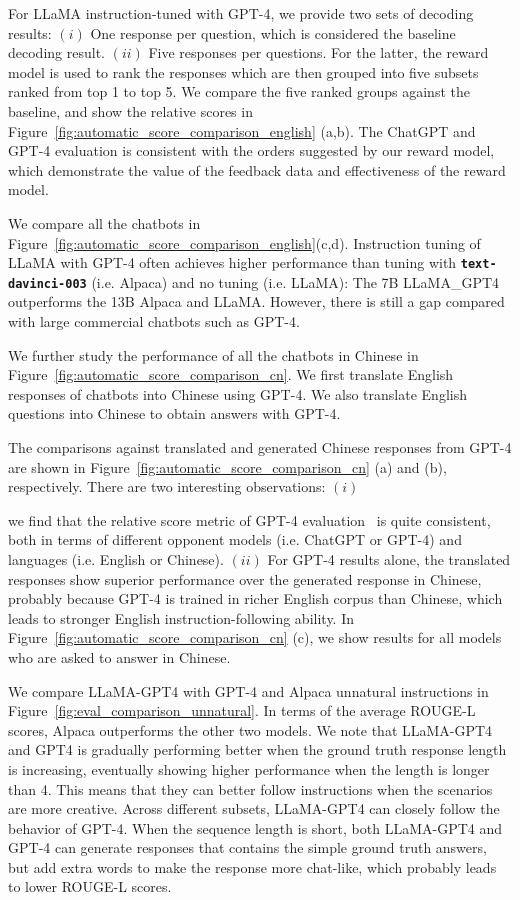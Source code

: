 For LLaMA instruction-tuned with GPT-4, we provide two sets of decoding results: $(i)$ One response per question, which is considered the baseline decoding result. $(ii)$ Five responses per questions. For the latter, the reward model is used to rank the responses which are then grouped into five subsets ranked from top 1 to top 5. We compare the five ranked groups against the baseline, and show the relative scores in Figure~\ref{fig:automatic_score_comparison_english} (a,b). The ChatGPT and GPT-4 evaluation is consistent with the orders suggested by our reward model, which demonstrate the value of the feedback data and effectiveness of the reward model.

We compare all the chatbots in Figure~\ref{fig:automatic_score_comparison_english}(c,d).  
Instruction tuning of LLaMA with GPT-4 often achieves higher performance than tuning with \texttt{\bfseries text-davinci-003} (i.e. Alpaca) and no tuning (i.e. LLaMA): The 7B LLaMA\_GPT4 outperforms the 13B Alpaca and LLaMA. However, there is still a gap compared with large commercial chatbots such as GPT-4. 

We further study the performance of all the chatbots in Chinese in Figure~\ref{fig:automatic_score_comparison_cn}. We first translate English responses of chatbots into Chinese using GPT-4. We also translate English questions into Chinese to obtain answers with GPT-4. 

The comparisons against translated and generated Chinese responses from GPT-4 are shown in Figure~\ref{fig:automatic_score_comparison_cn} (a) and (b), respectively. There are two interesting observations: $(i)$ 

we find that the relative score metric of GPT-4 evaluation~\citep{vicuna} is quite consistent, both in terms of different opponent models (i.e. ChatGPT or GPT-4) and languages (i.e. English or Chinese). $(ii)$ For GPT-4 results alone, the translated responses show superior performance over the generated response in Chinese, probably because GPT-4 is trained in richer English corpus than Chinese, which leads to stronger English instruction-following ability.  In Figure~\ref{fig:automatic_score_comparison_cn} (c), we show results for all models who are asked to answer in Chinese. 

We compare LLaMA-GPT4 with GPT-4 and Alpaca unnatural instructions in Figure~\ref{fig:eval_comparison_unnatural}. In terms of the average ROUGE-L scores, Alpaca outperforms the other two models. We note that LLaMA-GPT4 and GPT4 is gradually performing better when the ground truth response length is increasing, eventually showing higher performance when the length is longer than 4. This means that they can better follow instructions when the scenarios are more creative. Across different subsets, LLaMA-GPT4 can closely follow the behavior of GPT-4. When the sequence length is short, both LLaMA-GPT4 and GPT-4 can generate responses that contains the simple ground truth answers, but add extra words to make the response more chat-like, which probably leads to lower ROUGE-L scores. 

